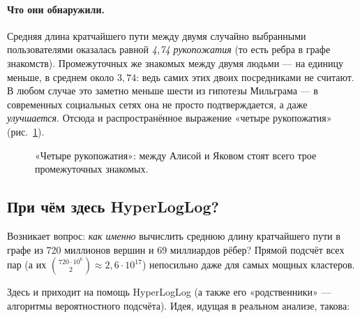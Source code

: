 \paragraph*{Что они обнаружили.} Средняя длина кратчайшего пути между двумя случайно выбранными пользователями оказалась равной \emph{4{,}74 рукопожатия} (то есть ребра в графе знакомств). Промежуточных же знакомых между двумя людьми --- на единицу меньше, в среднем около $3{,}74$: ведь самих этих двоих посредниками не считают. В любом случае это заметно меньше шести из гипотезы Мильграма --- в современных социальных сетях она не просто подтверждается, а даже \emph{улучшается}. Отсюда и распространённое выражение «четыре рукопожатия» (рис.~\ref{fig:p6-3}).

\begin{figure}[H]
\centering
{}
\caption{«Четыре рукопожатия»: между Алисой и Яковом стоят всего трое промежуточных знакомых.}
\label{fig:p6-3}
\end{figure}

\subsection{При чём здесь HyperLogLog?}

Возникает вопрос: \emph{как именно} вычислить среднюю длину кратчайшего пути в графе из 720 миллионов вершин и 69 миллиардов рёбер? Прямой подсчёт всех пар (а их $\binom{720{\cdot}10^6}{2} \approx 2{,}6 \cdot 10^{17}$) непосильно даже для самых мощных кластеров.

Здесь и приходит на помощь HyperLogLog (а также его «родственники» --- алгоритмы вероятностного подсчёта). Идея, идущая в реальном анализе, такова:

